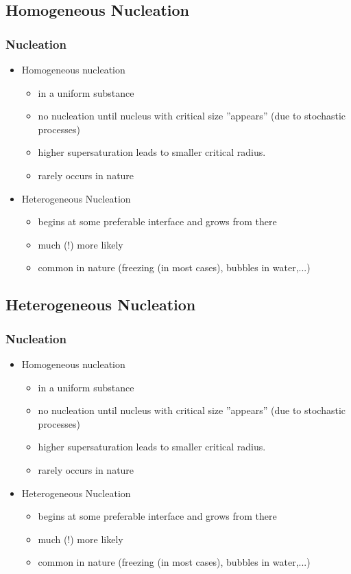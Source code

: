 \documentclass{beamer}
\begin{document}
\subsection{Homogeneous  Nucleation}\begin{frame}\frametitle{Nucleation}
\begin{itemize}
\item
Homogeneous nucleation
\begin{itemize}
\item in a uniform substance
\item no nucleation until nucleus with critical size ''appears'' (due to stochastic processes)
\item higher supersaturation leads to smaller critical radius.
\item rarely occurs in nature
\end{itemize}
\item Heterogeneous Nucleation{}
\begin{itemize}
\item begins at some preferable interface and grows from there
\item much (!) more likely
\item common in nature (freezing (in most cases), bubbles in water,...)
\end{itemize}
\end{itemize}
\end{frame}
\subsection{Heterogeneous  Nucleation}
\begin{frame}\frametitle{Nucleation}
\begin{itemize}
\item
Homogeneous nucleation
\begin{itemize}
\item in a uniform substance
\item no nucleation until nucleus with critical size ''appears'' (due to stochastic processes)
\item higher supersaturation leads to smaller critical radius.
\item rarely occurs in nature
\end{itemize}
\item Heterogeneous Nucleation{}
\begin{itemize}
\item begins at some preferable interface and grows from there
\item much (!) more likely
\item common in nature (freezing (in most cases), bubbles in water,...)
\end{itemize}
\end{itemize}
\end{frame}
\end{document}

